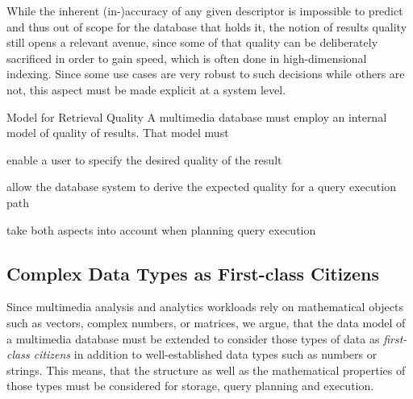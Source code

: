 While the inherent (in-)accuracy of any given descriptor is impossible to predict and thus out of scope for the database that holds it, the notion of results quality still opens a relevant avenue, since some of that quality can be deliberately sacrificed in order to gain speed, which is often done in high-dimensional indexing. Since some use cases are very robust to such decisions while others are not, this aspect must be made explicit at a system level.

\begin{requirement}[label=requirement:quality_model]{Model for Retrieval Quality}{}
    A multimedia database must employ an internal model of quality of results. That model must
    \begin{enumerate*}[label=(\roman*),itemjoin={{, }}, itemjoin*={{, and, }}, after={{.}}]
        \item enable a user to specify the desired quality of the result
        \item allow the database system to derive the expected quality for a query execution path
        \item take both aspects into account when planning query execution
    \end{enumerate*}
\end{requirement}

\subsection{Complex Data Types as First-class Citizens}
Since multimedia analysis and analytics workloads rely on mathematical objects such as vectors, complex numbers, or matrices, we argue, that the data model of a multimedia database must be extended to consider those types of data as \emph{first-class citizens} in addition to well-established data types such as numbers or strings. This means, that the structure as well as the mathematical properties of those types must be considered for storage, query planning and execution.

